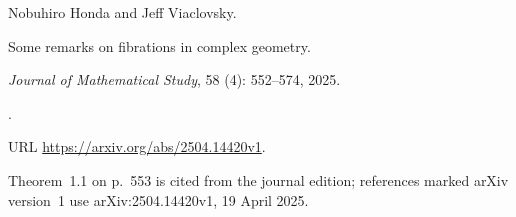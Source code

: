 Nobuhiro Honda and Jeff Viaclovsky.

\newblock Some remarks on fibrations in complex geometry.

\newblock \emph{Journal of Mathematical Study}, 58 (4):
  552--574, 2025.

\newblock {}.

\newblock URL \url{https://arxiv.org/abs/2504.14420v1}.

\newblock Theorem~1.1 on p.~553 is cited from the journal edition; references marked arXiv version~1 use arXiv:2504.14420v1, 19 April 2025.
